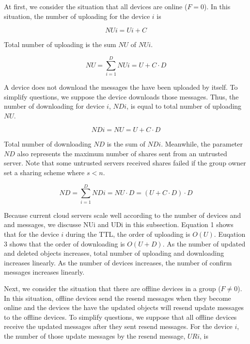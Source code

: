 \documentclass[twocolumn,10pt]{article}
\begin{document}
At first, we consider the situation that all devices are online ($F=0$).
In this situation, the number of uploading for the device $i$ is

\begin{equation}
NUi = Ui + C
\end{equation}

Total number of uploading is the sum $NU$ of $NUi$.

\begin{equation}
NU = \sum_{i=1}^{D} NUi = U + C \cdot D
\end{equation}

A device does not download the messages the have been uploaded by itself.
To simplify questions, we suppose the device downloads those messages.
Thus, the number of downloading for device $i$, $NDi$, is equal to total number of uploading $NU$.

\begin{equation}
NDi = NU = U + C \cdot D
\end{equation}

Total number of downloading $ND$ is the sum of $NDi$.
Meanwhile, the parameter $ND$ also represents the maximum number of shares sent from an untrusted server.
Note that some untrusted servers received shares failed if the group owner set a sharing scheme where $s < n$.

\begin{equation}
ND = \sum_{i=1}^{D} NDi = NU \cdot D =  (U + C \cdot D) \cdot D
\end{equation}

Because current cloud servers scale well according to the number of devices and and messages, we discusse NUi and UDi in this subsection.
Equation 1 shows that for the device $i$ during the TTL, the order of uploading  is $O(U)$.
Euqation 3 shows that the order of downloading is $O(U+D)$.
As the number of updated and deleted objects increases, total number of uploading and downloading increases linearly.
As the number of devices increases, the number of confirm messages increases linearly.

Next, we consider the situation that there are offline devices in a group ($F \neq 0$).
In this situation, offline devices send the resend messages when they become online and the devices the have the updated objects will resend update messages to the offline devices.
To simplify questions, we suppose that all offline devices receive the updated messages after they sent resend messages.
For the device $i$, the number of those update messages by the resend message, $URi$, is
\end{document}
